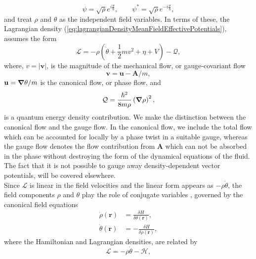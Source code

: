 \documentclass[twocolumn, nofootinbib, nobibnotes, amsmath,amssymb,aps, pra, floatfix]{revtex4-1}
\renewcommand{\v}[1]{\ensuremath{\mathbf{#1}}} %
\newcommand{\gv}[1]{\ensuremath{\mbox{\boldmath$ #1 $}}} %
\newcommand{\abs}[1]{\left| #1 \right|} %
\newcommand{\grad}[1]{\gv{\nabla} #1} %
\begin{document}
\begin{equation}
  \psi=\sqrt{\rho}e^{i\frac{\theta}{\hbar}},\quad\quad\psi^*=\sqrt{\rho}e^{-i\frac{\theta}{\hbar}},
\label{eq:polar_form_Psi}
\end{equation}
and treat $\rho$ and $\theta$ as the independent field variables.
In terms of these, the Lagrangian density (\ref{eq:lagrangianDensityMeanFieldEffectivePotentials}), assumes the form
\begin{equation}
  \mathcal{L}=-\rho\left( \dot{\theta}+\frac{1}{2}mv^2+\eta+V \right)-\mathcal{Q},
  \label{eq:lagrangianDensityMeanFieldEffectivePotentialsHydrodynamicalForm}
\end{equation}
where, $v=\abs{\v{v}}$, is the magnitude of the mechanical flow, or gauge-covariant flow
\begin{equation}
  \v{v}=\v{u}-\v{A}/m,
  \label{eq:velocity_field_gauge_covariant_polar_form}
\end{equation}
$\v{u}=\grad{\theta}/m$ is the canonical flow, or phase flow, and 
\begin{equation}
  \mathcal{Q}=\frac{\hbar^2}{8m\rho}\left(\grad{\rho}\right)^2,
  \label{eq:quantum_energy_density}
\end{equation}
is a quantum energy density contribution.
We make the distinction between the canonical flow and the gauge flow.
In the canonical flow, we include the total flow which can be accounted for locally by a phase twist in a suitable gauge, whereas the gauge flow denotes the flow contribution from $\v{A}$ which can not be absorbed in the phase without destroying the form of the dynamical equations of the fluid.
The fact that it is not possible to gauge away density-dependent vector potentials, will be covered elsewhere.\\
Since $\mathcal{L}$ is linear in the field velocities and the linear form appears as $-\rho\dot{\theta}$, the field components $\rho$ and $\theta$ play the role of conjugate variables \cite{jackiw1994quantization,buggy2019hydrodynamic}, governed by the canonical field equations
\begin{align}
  \dot{\rho}\left( \v{r} \right)&=\frac{\delta H}{\delta\theta\left( \v{r} \right)}, \label{eq:canonical_equations_hydrodynamic_conjugate_rho}\\
  \dot{\theta}\left( \v{r} \right)&=-\frac{\delta H}{\delta\rho\left( \v{r} \right)}, \label{eq:canonical_equations_hydrodynamic_conjugate_theta}
\end{align}
where the Hamiltonian and Lagrangian densities, are related by
\begin{equation}
  \mathcal{L}=-\rho\dot{\theta}-\mathcal{H},
  \label{eq:LagrangianDensityHamiltonianDensity}
\end{equation}
\end{document}
